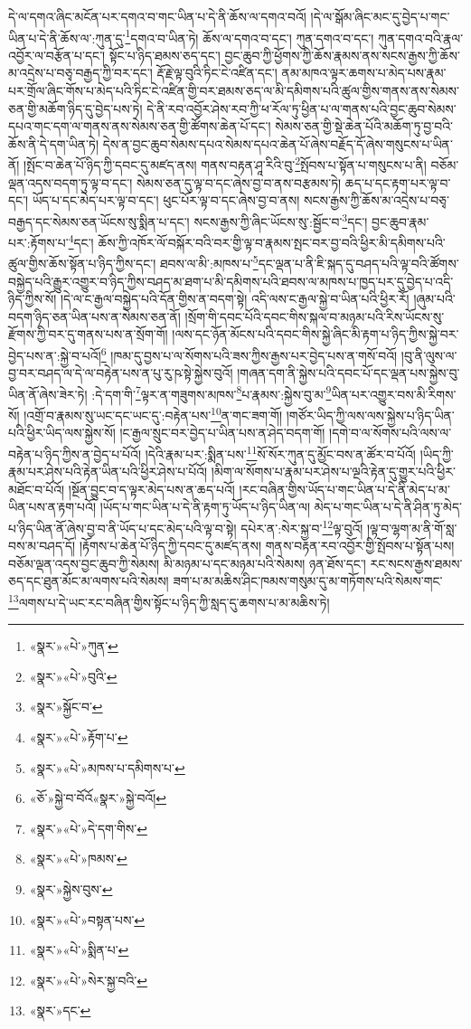 དེ་ལ་དགའ་ཞིང་མངོན་པར་དགའ་བ་གང་ཡིན་པ་དེ་ནི་ཆོས་ལ་དགའ་བའོ། །དེ་ལ་སྒོམ་ཞིང་མང་དུ་བྱེད་པ་གང་ཡིན་པ་དེ་ནི་ཆོས་ལ་:ཀུན་དུ་\footnote{«སྣར་»«པེ་»ཀུན་}དགའ་བ་ཡིན་ཏེ། ཆོས་ལ་དགའ་བ་དང་། ཀུན་དགའ་བ་དང་། ཀུན་དགའ་བའི་རྣལ་འབྱོར་ལ་བརྩོན་པ་དང་། སྟོང་པ་ཉིད་ཐམས་ཅད་དང་། བྱང་ཆུབ་ཀྱི་ཕྱོགས་ཀྱི་ཆོས་རྣམས་ནས་སངས་རྒྱས་ཀྱི་ཆོས་མ་འདྲེས་པ་བཅྭ་བརྒྱད་ཀྱི་བར་དང་། རྡོ་རྗེ་ལྟ་བུའི་ཏིང་ངེ་འཛིན་དང་། ནམ་མཁའ་ལྟར་ཆགས་པ་མེད་པས་རྣམ་པར་གྲོལ་ཞིང་གོས་པ་མེད་པའི་ཏིང་ངེ་འཛིན་གྱི་བར་ཐམས་ཅད་ལ་མི་དམིགས་པའི་ཚུལ་གྱིས་གནས་ནས་སེམས་ཅན་གྱི་མཆོག་ཉིད་དུ་བྱེད་པས་ཏེ། དེ་ནི་རབ་འབྱོར་ཤེས་རབ་ཀྱི་ཕ་རོལ་ཏུ་ཕྱིན་པ་ལ་གནས་པའི་བྱང་ཆུབ་སེམས་དཔའ་གང་དག་ལ་གནས་ནས་སེམས་ཅན་གྱི་ཚོགས་ཆེན་པོ་དང་། སེམས་ཅན་གྱི་སྡེ་ཆེན་པོའི་མཆོག་ཏུ་བྱ་བའི་ཆོས་ནི་དེ་དག་ཡིན་ཏེ། དེས་ན་བྱང་ཆུབ་སེམས་དཔའ་སེམས་དཔའ་ཆེན་པོ་ཞེས་བརྗོད་དོ་ཞེས་གསུངས་པ་ཡིན་ནོ། །སྤོང་བ་ཆེན་པོ་ཉིད་ཀྱི་དབང་དུ་མཛད་ནས། གནས་བརྟན་ཤཱ་རིའི་བུ་\footnote{«སྣར་»«པེ་»བུའི་}སྤོབས་པ་སྟོན་པ་གསུངས་པ་ནི། བཅོམ་ལྡན་འདས་བདག་ཏུ་ལྟ་བ་དང་། སེམས་ཅན་དུ་ལྟ་བ་དང་ཞེས་བྱ་བ་ནས་བརྩམས་ཏེ། ཆད་པ་དང་རྟག་པར་ལྟ་བ་དང་། ཡོད་པ་དང་མེད་པར་ལྟ་བ་དང་། ཕུང་པོར་ལྟ་བ་དང་ཞེས་བྱ་བ་ནས། སངས་རྒྱས་ཀྱི་ཆོས་མ་འདྲེས་པ་བཅྭ་བརྒྱད་དང་སེམས་ཅན་ཡོངས་སུ་སྨིན་པ་དང་། སངས་རྒྱས་ཀྱི་ཞིང་ཡོངས་སུ་:སྦྱོང་བ་\footnote{«སྣར་»སྐྱོང་བ་}དང་། བྱང་ཆུབ་རྣམ་པར་:རྟོགས་པ་\footnote{«སྣར་»«པེ་»རྟོག་པ་}དང་། ཆོས་ཀྱི་འཁོར་ལོ་བསྐོར་བའི་བར་གྱི་ལྟ་བ་རྣམས་སྤང་བར་བྱ་བའི་ཕྱིར་མི་དམིགས་པའི་ཚུལ་གྱིས་ཆོས་སྟོན་པ་ཉིད་ཀྱིས་དང་། ཐབས་ལ་མི་:མཁས་པ་\footnote{«སྣར་»«པེ་»མཁས་པ་དམིགས་པ་}དང་ལྡན་པ་ནི་ཇི་སྐད་དུ་བཤད་པའི་ལྟ་བའི་ཚོགས་བསྐྱེད་པའི་རྒྱུར་འགྱུར་བ་ཉིད་ཀྱིས་བཤད་མ་ཐག་པ་མི་དམིགས་པའི་ཐབས་ལ་མཁས་པ་ཁྱད་པར་དུ་བྱེད་པ་འདི་ཉིད་ཀྱིས་སོ། །དེ་ལ་ང་རྒྱལ་བསྐྱེད་པའི་དོན་གྱིས་ན་བདག་སྟེ། འདི་ལས་ང་རྒྱལ་སྐྱེ་བ་ཡིན་པའི་ཕྱིར་རོ། །ཞུམ་པའི་བདག་ཉིད་ཅན་ཡིན་པས་ན་སེམས་ཅན་ནོ། །སྲོག་གི་དབང་པོའི་དབང་གིས་སྐལ་བ་མཉམ་པའི་རིས་ཡོངས་སུ་རྫོགས་ཀྱི་བར་དུ་གནས་པས་ན་སྲོག་གོ། །ལས་དང་ཉོན་མོངས་པའི་དབང་གིས་སྐྱེ་ཞིང་མི་རྟག་པ་ཉིད་ཀྱིས་སྐྱེ་བར་བྱེད་པས་ན་:སྐྱེ་བ་པའོ།\footnote{«ཅོ་»སྐྱེ་བ་བོའོ«སྣར་»སྐྱེ་བའོ།} །ཁམ་དུ་བྱས་པ་ལ་སོགས་པའི་ཟས་ཀྱིས་རྒྱས་པར་བྱེད་པས་ན་གསོ་བའོ། །བུ་ནི་ལུས་ལ་བྱ་བར་བཤད་ལ་དེ་ལ་བརྟེན་པས་ན་པུ་རུ་ཥ་སྟེ་སྐྱེས་བུའོ། །གཞན་དག་ནི་སྐྱེས་པའི་དབང་པོ་དང་ལྡན་པས་སྐྱེས་བུ་ཡིན་ནོ་ཞེས་ཟེར་ཏེ། :དེ་དག་གི་\footnote{«སྣར་»«པེ་»དེ་དག་གིས་}ལྟར་ན་གཟུགས་མཁས་\footnote{«སྣར་»«པེ་»ཁམས་}པ་རྣམས་:སྐྱེས་བུ་མ་\footnote{«སྣར་»སྐྱེས་བུས་}ཡིན་པར་འགྱུར་བས་མི་རིགས་སོ། །འགྲོ་བ་རྣམས་སུ་ཡང་དང་ཡང་དུ་:བརྟེན་པས་\footnote{«སྣར་»«པེ་»བསྟན་པས་}ན་གང་ཟག་གོ། །གཙོར་ཡིད་ཀྱི་ལས་ལས་སྐྱེས་པ་ཉིད་ཡིན་པའི་ཕྱིར་ཡིད་ལས་སྐྱེས་སོ། །ང་རྒྱལ་སྲུང་བར་བྱེད་པ་ཡིན་པས་ན་ཤེད་བདག་གོ། །དགེ་བ་ལ་སོགས་པའི་ལས་ལ་བརྟེན་པ་ཉིད་ཀྱིས་ན་བྱེད་པ་པོའོ། །དེའི་རྣམ་པར་:སྨིན་པས་\footnote{«སྣར་»«པེ་»སྨིན་པ་}སོ་སོར་ཀུན་དུ་མྱོང་བས་ན་ཚོར་བ་པོའོ། །ཡིད་ཀྱི་རྣམ་པར་ཤེས་པའི་རྟེན་ཡིན་པའི་ཕྱིར་ཤེས་པ་པོའོ། །མིག་ལ་སོགས་པ་རྣམ་པར་ཤེས་པ་ལྔའི་རྟེན་དུ་གྱུར་པའི་ཕྱིར་མཐོང་བ་པོའོ། །སྔོན་བྱུང་བ་ད་ལྟར་མེད་པས་ན་ཆད་པའོ། །རང་བཞིན་གྱིས་ཡོད་པ་གང་ཡིན་པ་དེ་ནི་མེད་པ་མ་ཡིན་པས་ན་རྟག་པའོ། །ཡོད་པ་གང་ཡིན་པ་དེ་ནི་རྟག་ཏུ་ཡོད་པ་ཉིད་ཡིན་ལ། མེད་པ་གང་ཡིན་པ་དེ་ནི་ཤིན་ཏུ་མེད་པ་ཉིད་ཡིན་ནོ་ཞེས་བྱ་བ་ནི་ཡོད་པ་དང་མེད་པའི་ལྟ་བ་སྟེ། དཔེར་ན་:སེར་སྐྱ་བ་\footnote{«སྣར་»«པེ་»སེར་སྐྱ་བའི་}ལྟ་བུའོ། །ལྟ་བ་ལྷག་མ་ནི་གོ་སླ་བས་མ་བཤད་དོ། །རྟོགས་པ་ཆེན་པོ་ཉིད་ཀྱི་དབང་དུ་མཛད་ནས། གནས་བརྟན་རབ་འབྱོར་གྱི་སྤོབས་པ་སྟོན་པས། བཅོམ་ལྡན་འདས་བྱང་ཆུབ་ཀྱི་སེམས། མི་མཉམ་པ་དང་མཉམ་པའི་སེམས། ཉན་ཐོས་དང་། རང་སངས་རྒྱས་ཐམས་ཅད་དང་ཐུན་མོང་མ་ལགས་པའི་སེམས། ཟག་པ་མ་མཆིས་ཤིང་ཁམས་གསུམ་དུ་མ་གཏོགས་པའི་སེམས་གང་\footnote{«སྣར་»དང་}ལགས་པ་དེ་ཡང་རང་བཞིན་གྱིས་སྟོང་པ་ཉིད་ཀྱི་སླད་དུ་ཆགས་པ་མ་མཆིས་ཏེ། 